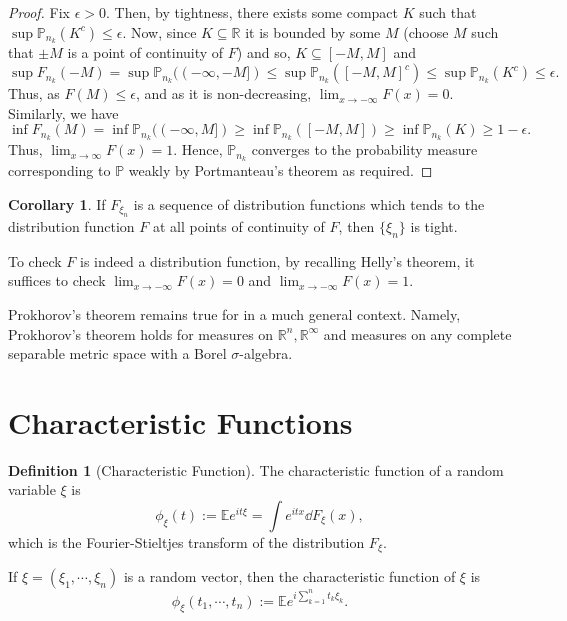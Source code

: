 \documentclass[]{article}
\theoremstyle{definition}
\newtheorem{corollary}{Corollary}[theorem]
\theoremstyle{definition}
\newtheorem{definition}{Definition}[section]
\begin{document}
\begin{proof}
  Fix \(\epsilon > 0\). Then, by tightness, there exists some compact \(K\) 
  such that \(\sup \mathbb{P}_{n_k}(K^c) \le \epsilon\). Now, since 
  \(K \subseteq \mathbb{R}\) it is bounded by some \(M\) (choose \(M\) such that 
  \(\pm M\) is a point of continuity of \(F\)) and so, 
  \(K \subseteq [-M, M]\) and 
  \[\sup F_{n_k}(-M) = 
    \sup \mathbb{P}_{n_k}((-\infty, -M]) \le 
    \sup \mathbb{P}_{n_k}([-M, M]^c) \le 
    \sup \mathbb{P}_{n_k}(K^c) \le \epsilon.\]
  Thus, as \(F(M) \le \epsilon\), and as it is non-decreasing, 
  \(\lim_{x \to -\infty} F(x) = 0\). Similarly, we have 
  \[\inf F_{n_k}(M) = \inf \mathbb{P}_{n_k}((-\infty, M]) 
    \ge \inf \mathbb{P}_{n_k}([-M, M]) \ge \inf \mathbb{P}_{n_k}(K) \ge 1 - \epsilon.\]
  Thus, \(\lim_{x \to \infty} F(x) = 1\). Hence, \(\mathbb{P}_{n_k}\) 
  converges to the probability measure corresponding to \(\mathbb{P}\) weakly 
  by Portmanteau's theorem as required.
\end{proof}

\begin{corollary}
  If \(F_{\xi_n}\) is a sequence of distribution functions which tends to the distribution 
  function \(F\) at all points of continuity of \(F\), then \(\{\xi_n\}\) is 
  tight.
\end{corollary}

To check \(F\) is indeed a distribution function, by recalling Helly's theorem, 
it suffices to check \(\lim_{x \to -\infty}F(x) = 0\) and \(\lim_{x \to -\infty}F(x) = 1\).

Prokhorov's theorem remains true for in a much general context. Namely, Prokhorov's 
theorem holds for measures on \(\mathbb{R}^n, \mathbb{R}^\infty\) and measures 
on any complete separable metric space with a Borel \(\sigma\)-algebra.

\newpage
\section{Characteristic Functions}

\begin{definition}[Characteristic Function]
  The characteristic function of a random variable \(\xi\) is 
  \[\phi_{\xi}(t) := \mathbb{E}e^{it\xi} = \int e^{itx} \dd F_{\xi}(x),\]
  which is the Fourier-Stieltjes transform of the distribution \(F_{\xi}\).

  If \(\xi = (\xi_1, \cdots, \xi_n)\) is a random vector, then the characteristic 
  function of \(\xi\) is 
  \[\phi_{\xi}(t_1, \cdots, t_n) := \mathbb{E}e^{i\sum_{k = 1}^n t_k \xi_k}.\]
\end{definition}
\end{document}
